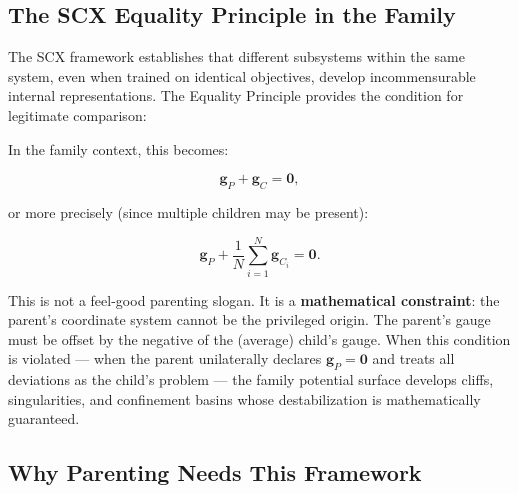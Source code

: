 \documentclass[11pt,a4paper]{article}
\begin{document}
\subsection{The SCX Equality Principle in the Family}

The SCX framework establishes that different subsystems within the same system, even when trained on identical objectives, develop incommensurable internal representations. The Equality Principle provides the condition for legitimate comparison:

\begin{center}
\end{center}

In the family context, this becomes:

\begin{equation}
    \mathbf{g}_P + \mathbf{g}_C = \mathbf{0},
    \label{eq:family_gauge}
\end{equation}

or more precisely (since multiple children may be present):

\begin{equation}
    \mathbf{g}_P + \frac{1}{N}\sum_{i=1}^{N} \mathbf{g}_{C_i} = \mathbf{0}.
    \label{eq:family_gauge_multi}
\end{equation}

This is not a feel-good parenting slogan. It is a \textbf{mathematical constraint}: the parent's coordinate system cannot be the privileged origin. The parent's gauge must be offset by the negative of the (average) child's gauge. When this condition is violated — when the parent unilaterally declares $\mathbf{g}_P = \mathbf{0}$ and treats all deviations as the child's problem — the family potential surface develops cliffs, singularities, and confinement basins whose destabilization is mathematically guaranteed.

\subsection{Why Parenting Needs This Framework}
\end{document}
